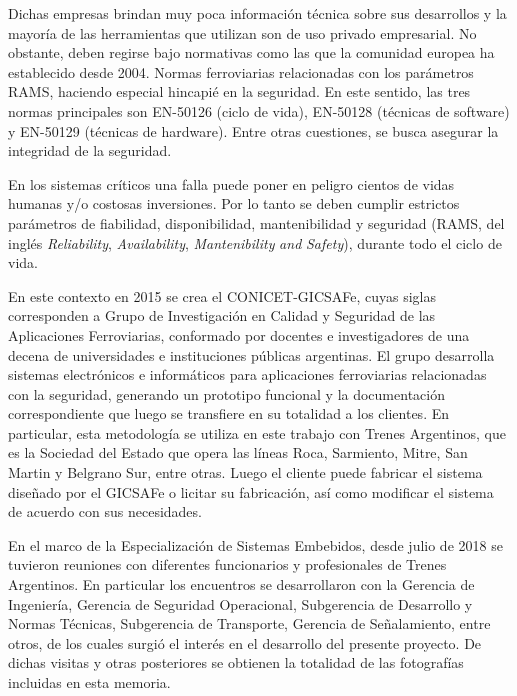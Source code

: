 		Dichas empresas brindan muy poca información técnica sobre sus desarrollos y la mayoría de las herramientas que utilizan son de uso privado empresarial. No obstante, deben regirse bajo normativas como las que la comunidad europea ha establecido desde 2004. Normas ferroviarias relacionadas con los parámetros RAMS, haciendo especial hincapié en la seguridad. En este sentido, las tres normas principales son EN-50126\citep{EN50126} (ciclo de vida), EN-50128\citep{EN50128} (técnicas de software) y EN-50129\citep{EN50129} (técnicas de hardware). Entre otras cuestiones, se busca asegurar la integridad de la seguridad.	
		
		En los sistemas críticos una falla puede poner en peligro cientos de vidas humanas y/o costosas inversiones. Por lo tanto se deben cumplir estrictos parámetros de fiabilidad, disponibilidad, mantenibilidad y seguridad (RAMS, del inglés \textit{Reliability}, \textit{Availability}, \textit{Mantenibility} \textit{and} \textit{Safety}), durante todo el ciclo de vida.
		
		En este contexto en 2015 se crea el CONICET-GICSAFe, cuyas siglas corresponden a Grupo de Investigación en Calidad y Seguridad de las Aplicaciones Ferroviarias, conformado por docentes e investigadores de una decena de universidades e instituciones públicas argentinas\citep{GICSAFE}. El grupo desarrolla sistemas electrónicos e informáticos para aplicaciones ferroviarias relacionadas con la seguridad, generando un prototipo funcional y la documentación correspondiente que luego se transfiere en su totalidad a los clientes. En particular, esta metodología se utiliza en este trabajo con Trenes Argentinos, que es la Sociedad del Estado que opera las líneas Roca, Sarmiento, Mitre, San Martin y Belgrano Sur, entre otras. Luego el cliente puede fabricar el sistema diseñado por el GICSAFe o licitar su fabricación, así como modificar el sistema de acuerdo con sus necesidades.   
	
		En el marco de la Especialización de Sistemas Embebidos, desde julio de 2018 se tuvieron reuniones con diferentes funcionarios y profesionales de Trenes Argentinos. En particular los encuentros se desarrollaron con la Gerencia de Ingeniería, Gerencia de Seguridad Operacional, Subgerencia de Desarrollo y Normas Técnicas, Subgerencia de Transporte, Gerencia de Señalamiento, entre otros, de los cuales surgió el interés en el desarrollo del presente proyecto. De dichas visitas y otras posteriores se obtienen la totalidad de las fotografías incluidas en esta memoria.
			 	
